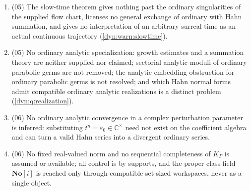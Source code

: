 \documentclass[11pt,letterpaper]{article}
\theoremstyle{definition}
\theoremstyle{remark}
\newcommand{\C}{\mathbb C}
\newcommand{\No}{\mathbf{No}}
\newcommand{\eps}{\varepsilon}
\numberwithin{equation}{section}
\begin{document}
\begin{enumerate}[label=\textbf{N\arabic*.},leftmargin=3.2em,start=47]
autonomous flow at a numerical parameter; \cite{GV} is cited precisely to
keep formal embedding and analytic embedding apart
(\cref{dyn:warn:embedding}).
\item (05) The slow-time theorem gives nothing past the ordinary
singularities of the supplied flow chart, licenses no general exchange of
ordinary with Hahn summation, and gives no interpretation of an arbitrary
surreal time as an actual continuous trajectory
(\cref{dyn:warn:slowtime}).
\item (05) No ordinary analytic specialization: growth estimates and a
summation theory are neither supplied nor claimed; sectorial analytic
moduli of ordinary parabolic germs are not removed; the analytic embedding
obstruction for ordinary parabolic germs is not resolved; and which Hahn
normal forms admit compatible ordinary analytic realizations is a distinct
problem (\cref{dyn:q:realization}).
\item (06) No ordinary analytic convergence in a complex perturbation
parameter is inferred: substituting $t^{\eta}=\eps_0\in\C^{\times}$ need
not exist on the coefficient algebra and can turn a valid Hahn series into
a divergent ordinary series.
\item (06) No fixed real-valued norm and no sequential completeness of
$K_\Gamma$ is assumed or available; all control is by supports, and the
proper-class field $\No[i]$ is reached only through compatible set-sized
workspaces, never as a single object.
\end{enumerate}
\end{document}
